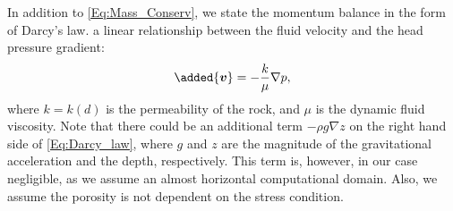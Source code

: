 
In addition to \eqref{Eq:Mass_Conserv}, we state the momentum balance in the form of Darcy's law.  a linear relationship between the fluid velocity and the head pressure gradient:
\begin{equation}\label{Eq:Darcy_law}
\begin{aligned}
\added{\bm{v}} = -\frac{k}{\mu} \nabla p,
\end{aligned}
\end{equation}
where $k=k(d)$ is the permeability of the rock, and $\mu$ is the dynamic fluid viscosity. %
Note that there could be an additional term $- \rho g\nabla z$ %
on the right hand side of \eqref{Eq:Darcy_law}, where $g$ and $z$ are the magnitude of the gravitational acceleration and the depth, respectively. This term is, however, in our case negligible, as we assume an almost horizontal computational domain.
Also, we assume the porosity is not dependent on the stress condition. 

